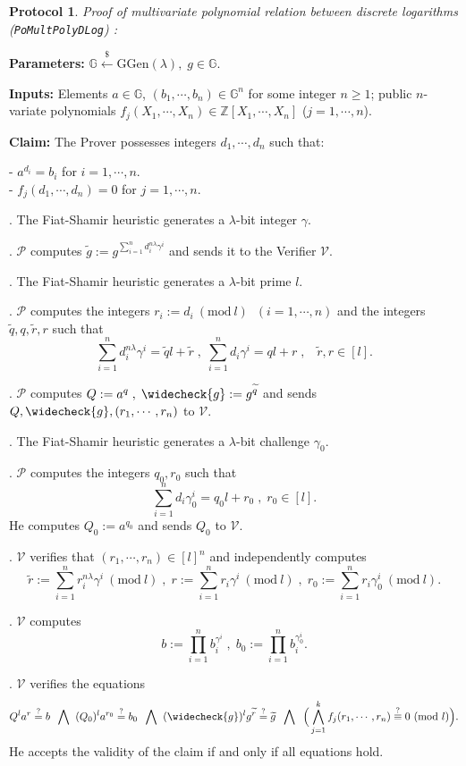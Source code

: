 \documentclass[11pt, lettersize, notitlepage, leqno, footskip=0.6cm]{article}
\newcommand{\bz}{\mathbb Z}
\newcommand{\pl}{\prod\limits}
\newcommand{\slim}{\sum\limits}
\newcommand{\wti}{\widetilde}
\newcommand{\mc}{\mathcal}
\newcommand{\mb}{\mathbb}
\newcommand{\mr}{\mathrm}
\newcommand{\lam}{\lambda}
\newcommand{\lamb}{\lambda}
\newcommand{\weck}{\widecheck}
\newcommand{\mP}{\mc{P}}
\newcommand{\V}{\mc{V}}
\newcommand{\vs}{\vspace{-0.15cm}}
\newcommand{\noin}{\noindent}
\newcommand{\sta}{\stackrel{?}{=}}
\newcommand{\Mod}[1]{\ (\mathrm{mod}\ #1)}
\newtheorem{Prot}[Thm]{Protocol}
\numberwithin{equation}{section}
\begin{document}
\vspace{0.2cm}

\begin{Prot} \normalfont \textit{Proof of multivariate polynomial relation between discrete logarithms}\\ (\verb|PoMultPolyDLog|) :\end{Prot} \vspace{-0.3cm}

\noindent \textbf{Parameters:} $\mb{G}\xleftarrow{\$} \mr{GGen}(\lamb), \; g\in \mb{G}$.

\noindent \textbf{Inputs:} Elements $a\in\mb{G} $, $(b_1,\cdots,b_n)\in \mb{G}^n$ for some integer $n\geq 1$; public $n$-variate polynomials $f_j(X_1,\cdots,X_n)\in \bz[X_1,\cdots,X_n]$ ($j=1,\cdots,n$).

\noindent \textbf{Claim:} The Prover possesses integers $d_1,\cdots, d_n$ such that:

\noindent- $a^{d_i} = b_i$ for $i = 1,\cdots, n$.\\
- $f_j(d_1,\cdots,d_n) = 0$ for $j = 1,\cdots, n$.

\begin{prf1} . The Fiat-Shamir heuristic generates a $\lam$-bit integer $\gamma$.

. $\mc{P}$ computes $\wti{g}:=g^{\sum\limits_{i=1}^n d_i^{n\lam}\gamma^i}$ and sends it to the Verifier $\mc{V}$.

. The Fiat-Shamir heuristic generates a $\lam$-bit prime $l$.
 
. $\mc{P}$ computes the integers $r_i:=d_i\Mod{l}\;\; (i=1,\cdots, n)$ and the integers $\wti{q}, q, \wti{r}, r$ such that \vs $$\slim_{i=1}^n d_i^{n\lam}\gamma^i = \wti{q}l+\wti{r}\;,\;\slim_{i=1}^n d_i\gamma^i = ql+r\;,\;\;\;\wti{r}, r\in [l] .$$

\noin 5. $\mP$ computes $Q:= a^q\;,\;\weck{g}:= g^{\wti{q}}$ and sends $Q,\weck{g},(r_1,\cdots,r_n)$ to  $\V$. 

\noin 6. The Fiat-Shamir heuristic generates a $\lam$-bit challenge $\gamma_0$.

\noin 7. $\mP$ computes the integers $q_0, r_0$ such that \vs $$\slim_{i=1}^n d_i\gamma_0^i = q_0l+r_0\;,\;r_0\in[l] .$$ He computes $Q_0:= a^{q_{0}}$ and sends $Q_0$ to $\V$.

. $\mc{V}$ verifies that $(r_1,\cdots,r_n)\in [l]^n$ and independently computes \vs $$\wti{r}:= \slim_{i=1}^n r_i^{n\lam}\gamma^i\Mod{l}\;,\;r:= \slim_{i=1}^n r_i\gamma^i\Mod{l}\;,\;r_0:= \slim_{i=1}^n r_i\gamma_0^i\Mod{l}.$$

\noin 9. $\V$ computes \vs $$b:= \pl_{i=1}^n b_i^{\gamma^i}\;,\;b_0:= \pl_{i=1}^n b_i^{\gamma_0^i}.$$

. $\mc{V}$ verifies the equations \vs $$ Q^{l} a^{r} \sta b \;\;\bigwedge\;\;(Q_0)^{l} a^{r_{0}} \sta b_0 \;\;\bigwedge\;\; (\weck{g})^lg^{\wti{r}} \stackrel{?}{=}\wti{g} \;\;\bigwedge\;\;\Big( \bigwedge\limits_{j=1}^k  f_j(r_1,\cdots,r_n) \stackrel{?}{\equiv} 0\Mod{l} \Big).$$ He accepts the validity of the claim if and only if all equations hold.\end{prf1}
\end{document}
